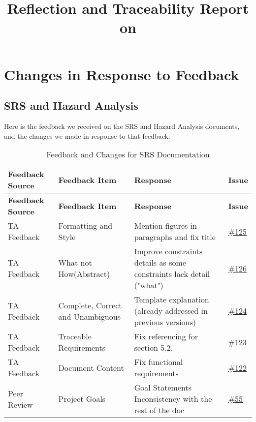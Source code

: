 \documentclass{article}
\title{Reflection and Traceability Report on \progname}
\author{\authname}
\date{}
\begin{document}
\maketitle

\section{Changes in Response to Feedback}

\subsection{SRS and Hazard Analysis}

Here is the feedback we received on the SRS and Hazard Analysis documents, and the changes we made in response to that feedback.

\begin{longtable}{| p{} | p{} | p{} | p{} |}
    \caption{Feedback and Changes for SRS Documentation } \\
    \hline
    \textbf{Feedback Source} & \textbf{Feedback Item} & \textbf{Response} & \textbf{Issue} \\
    \hline
    \endfirsthead
    \hline
    \textbf{Feedback Source} & \textbf{Feedback Item} & \textbf{Response} & \textbf{Issue} \\
    \hline
    \endhead
    \hline
    \endfoot
    TA Feedback & Formatting and Style & Mention figures in paragraphs and fix title & \href{https://github.com/RezaJodeiri/CXR-Capstone/issues/125}{\#125}\\
    \hline
    TA Feedback & What not How(Abstract) & Improve constraints details as some constraints lack detail ("what") & \href{https://github.com/RezaJodeiri/CXR-Capstone/issues/126}{\#126} \\
    \hline
    TA Feedback & Complete, Correct and Unambiguous & Template explanation (already addressed in previous versions) & \href{https://github.com/RezaJodeiri/CXR-Capstone/issues/124}{\#124}\\
    \hline
    TA Feedback & Traceable Requirements & Fix referencing for section 5.2. & \href{https://github.com/RezaJodeiri/CXR-Capstone/issues/123}{\#123} \\
    \hline
    TA Feedback & Document Content & Fix functional requirements & \href{https://github.com/RezaJodeiri/CXR-Capstone/issues/122}{\#122} \\
    \hline
    Peer Review & Project Goals & Goal Statements Inconsistency with the rest of the doc & \href{https://github.com/RezaJodeiri/CXR-Capstone/issues/55}{\#55} \\

\end{longtable}
\end{document}

